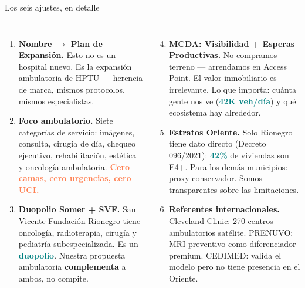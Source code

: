 \documentclass[aspectratio=169, 11pt]{beamer}
\newcommand{\highlight}[1]{\textcolor{teal}{\textbf{#1}}}
\newcommand{\danger}[1]{\textcolor{coral}{\textbf{#1}}}
\begin{document}
\begin{frame}{Los seis ajustes, en detalle}
\begin{columns}[T]
\scriptsize
\begin{enumerate}\setlength{\itemsep}{4pt}
  \item \textbf{Nombre $\to$ Plan de Expansión.} Esto no es un hospital nuevo. Es la expansión ambulatoria de HPTU --- herencia de marca, mismos protocolos, mismos especialistas.

  \item \textbf{Foco ambulatorio.} Siete categorías de servicio: imágenes, consulta, cirugía de día, chequeo ejecutivo, rehabilitación, estética y oncología ambulatoria. \danger{Cero camas, cero urgencias, cero UCI.}

  \item \textbf{Duopolio Somer + SVF.} San Vicente Fundación Rionegro tiene oncología, radioterapia, cirugía y pediatría subespecializada. Es un \highlight{duopolio}. Nuestra propuesta ambulatoria \textbf{complementa} a ambos, no compite.
\end{enumerate}

\scriptsize
\begin{enumerate}\setcounter{enumi}{3}\setlength{\itemsep}{4pt}
  \item \textbf{MCDA: Visibilidad + Esperas Productivas.} No compramos terreno --- arrendamos en Access Point. El valor inmobiliario es irrelevante. Lo que importa: cuánta gente nos ve (\highlight{42K veh/día}) y qué ecosistema hay alrededor.

  \item \textbf{Estratos Oriente.} Solo Rionegro tiene dato directo (Decreto 096/2021): \highlight{42\%} de viviendas son E4+. Para los demás municipios: proxy conservador. Somos transparentes sobre las limitaciones.

  \item \textbf{Referentes internacionales.} Cleveland Clinic: 270 centros ambulatorios satélite. PRENUVO: MRI preventivo como diferenciador premium. CEDIMED: valida el modelo pero no tiene presencia en el Oriente.
\end{enumerate}
\end{columns}
\end{frame}
\end{document}
